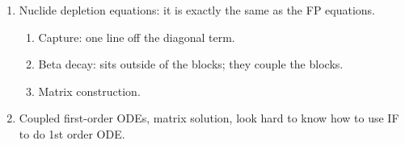\documentclass{school-22.211-notes}
\begin{document}
\begin{enumerate}
\item Nuclide depletion equations: it is exactly the same as the FP equations. 
  \begin{enumerate}
  \item Capture: one line off the diagonal term. 
  \item Beta decay: sits outside of the blocks; they couple the blocks. 
  \item Matrix construction. 
  \end{enumerate}

\item Coupled first-order ODEs, matrix solution, look hard to know how to use IF to do 1st order ODE. 
\end{enumerate}



\clearpage
{}
\end{document}
